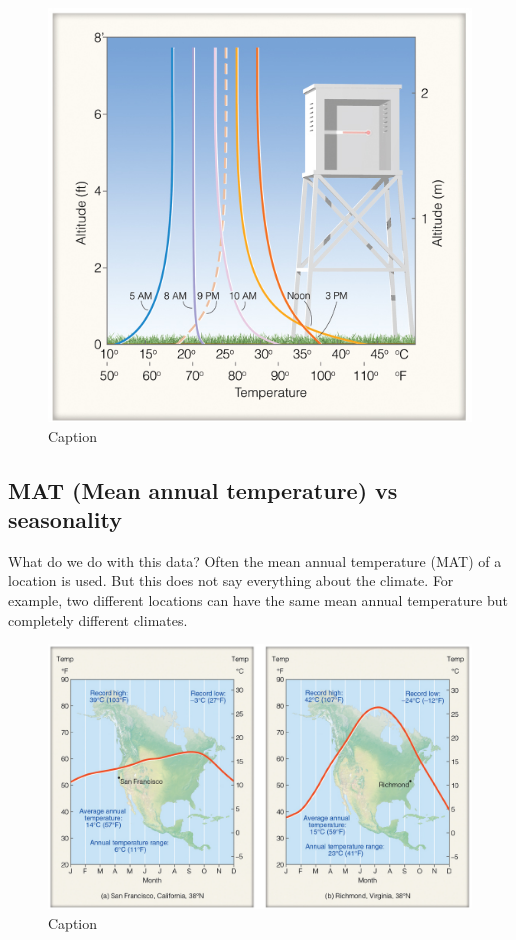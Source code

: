 \documentclass[12pt,oneside]{book}
\begin{document}
\begin{figure}

{\centering \includegraphics[width=0.7\linewidth]{figures/Figure221} 

}

\caption{Caption}\label{fig:Huts}
\end{figure}

\subsection{MAT (Mean annual temperature) vs
seasonality}\label{mat-mean-annual-temperature-vs-seasonality}

What do we do with this data? Often the mean annual temperature (MAT) of
a location is used. But this does not say everything about the climate.
For example, two different locations can have the same mean annual
temperature but completely different climates.

\begin{figure}

{\centering \includegraphics[width=0.7\linewidth]{figures/Figure222} 

}

\caption{Caption}\label{fig:MAT1}
\end{figure}
\end{document}
